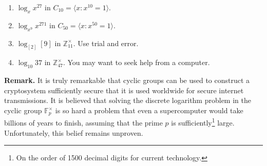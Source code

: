 \documentclass[11pt]{article}
\newenvironment{problems}
{
 \begin{enumerate}[topsep=1pt,itemsep=0pt,parsep=2pt,leftmargin=0.6cm,%
 label={\arabic*.}, ref=\arabic*] \small
}
{
 \end{enumerate}
}
\theoremstyle{definition}
\newcommand{\Z}{\mathbb{Z}} %
\newcommand{\F}{{\mathbb F}}
\newcommand{\gen}[1]{\langle #1 \rangle}
\begin{document}
\begin{problems}
  \begin{enumerate}
  \item $\log_x x^{27}$ in $C_{10} = \gen{x: x^{10} = 1}$.
  \item $\log_{x^9} x^{271}$ in $C_{50} = \gen{x: x^{50} = 1}$. 
  \item $\log_{[2]} [9]$ in $\Z_{11}^\times$. Use trial and error.
  \item $\log_{10} 37$ in $\Z_{47}^\times$. You may want to seek help
    from a computer.
  \end{enumerate}

  \textbf{Remark.} It is truly remarkable that cyclic groups can be
  used to construct a cryptosystem sufficiently secure that it is used
  worldwide for secure internet transmissions. It is believed that
  solving the discrete logarithm problem in the cyclic group
  $\F_p^\times$ is so hard a problem that even a supercomputer would
  take billions of years to finish, assuming that the prime $p$ is
  sufficiently\footnote{On the order of 1500 decimal digits for
    current technology.}  large. Unfortunately, this belief remains
  unproven.

\end{problems}

\renewcommand{\thesection}{\arabic{section}}
\end{document}
